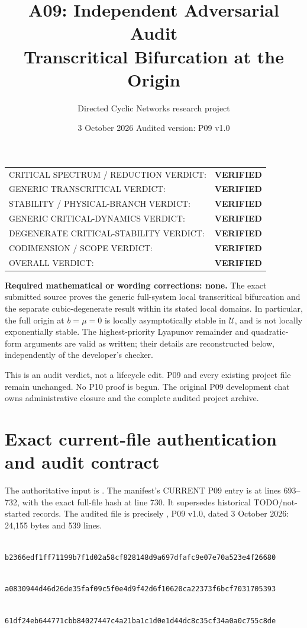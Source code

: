 \documentclass[11pt]{article}
\title{A09: Independent Adversarial Audit\\Transcritical Bifurcation at the Origin}
\author{Directed Cyclic Networks research project}
\date{3 October 2026 \quad Audited version: P09 v1.0}
\newcommand{\U}{\mathcal U}
\newcommand{\verified}{\textbf{VERIFIED}}
\begin{document}
\maketitle

\begin{tabular}{@{}p{}l@{}}
\toprule
CRITICAL SPECTRUM / REDUCTION VERDICT: & \verified\\
GENERIC TRANSCRITICAL VERDICT: & \verified\\
STABILITY / PHYSICAL-BRANCH VERDICT: & \verified\\
GENERIC CRITICAL-DYNAMICS VERDICT: & \verified\\
DEGENERATE CRITICAL-STABILITY VERDICT: & \verified\\
CODIMENSION / SCOPE VERDICT: & \verified\\
\midrule
OVERALL VERDICT: & \verified\\
\bottomrule
\end{tabular}

\textbf{Required mathematical or wording corrections: none.}
The exact submitted source proves the generic full-system local transcritical
bifurcation and the separate cubic-degenerate result within its stated local
domains. In particular, the full origin at $b=\mu=0$ is locally asymptotically
stable in $\U$, and is not locally exponentially stable. The highest-priority
Lyapunov remainder and quadratic-form arguments are valid as written; their
details are reconstructed below, independently of the developer's checker.

This is an audit verdict, not a lifecycle edit. P09 and every existing project
file remain unchanged. No P10 proof is begun. The original P09 development
chat owns administrative closure and the complete audited project archive.

\section{Exact current-file authentication and audit contract}
\label{sec:auth}
The authoritative input is .
The manifest's CURRENT P09 entry is at lines 693--732, with the exact full-file
hash at line 730. It supersedes historical TODO/not-started records.
The audited file is precisely
,
P09 v1.0, dated 3 October 2026: 24,155 bytes and 539 lines.

\begin{description}[leftmargin=0pt,labelwidth=0pt,itemindent=0pt]
\item[Full P09 SHA-256:]
\leavevmode\\\nolinkurl{b2366edf1ff71199b7f1d02a58cf828148d9a697dfafc9e07e70a523e4f26680}
\item[Mathematical body SHA-256, line 17 through EOF:]
\leavevmode\\\nolinkurl{a0830944d46d26de35faf09c5f0e4d9f42d6f10620ca22373f6bcf7031705393}
\item[Original complete draft ZIP SHA-256:]
\leavevmode\\\nolinkurl{61df24eb644771cbb84027447c4a21ba1c1d0e1d44dc8c35cf34a0a0c755c8de}
\end{description}
\end{document}
